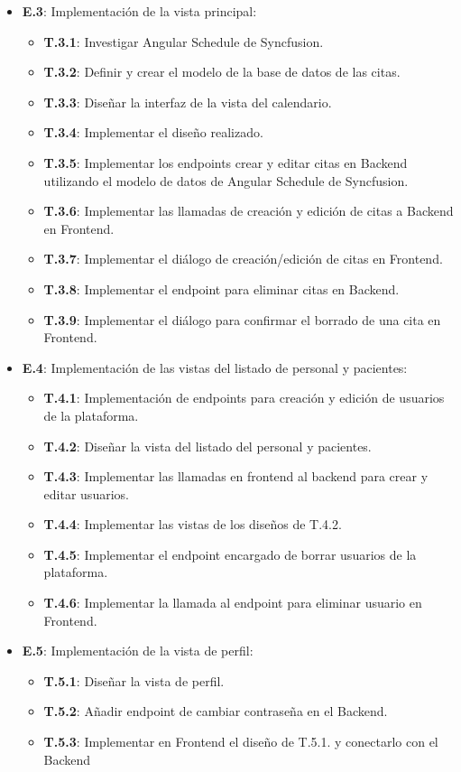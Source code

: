 \begin{itemize}
    \item \textbf{E.3}: Implementación de la vista principal:
    \begin{itemize}
        \item \textbf{T.3.1}: Investigar Angular Schedule de Syncfusion.
        \item \textbf{T.3.2}: Definir y crear el modelo de la base de datos de las citas.
        \item \textbf{T.3.3}: Diseñar la interfaz de la vista del calendario.
        \item \textbf{T.3.4}: Implementar el diseño realizado.
        \item \textbf{T.3.5}:  Implementar los endpoints crear y editar citas en Backend utilizando el modelo de datos de Angular Schedule de Syncfusion.
        \item \textbf{T.3.6}: Implementar las llamadas de creación y edición de citas a Backend en Frontend.
        \item \textbf{T.3.7}:  Implementar el diálogo de creación/edición de citas en Frontend.
        \item \textbf{T.3.8}: Implementar el endpoint para eliminar citas en Backend.
        \item \textbf{T.3.9}: Implementar el diálogo para confirmar el borrado de una cita en Frontend.
    \end{itemize}
    \item \textbf{E.4}: Implementación de las vistas del listado de personal y pacientes:
    \begin{itemize}
        \item \textbf{T.4.1}:  Implementación de endpoints para creación y edición de usuarios de la plataforma.
        \item \textbf{T.4.2}: Diseñar la vista del listado del personal y pacientes.
        \item \textbf{T.4.3}: Implementar las llamadas en frontend al backend para crear y editar usuarios.
        \item \textbf{T.4.4}: Implementar las vistas de los diseños de T.4.2.
        \item \textbf{T.4.5}: Implementar el endpoint encargado de borrar usuarios de la plataforma.
        \item \textbf{T.4.6}: Implementar la llamada al endpoint para eliminar usuario en Frontend.
    \end{itemize}
    \item \textbf{E.5}: Implementación de la vista de perfil:
    \begin{itemize}
        \item \textbf{T.5.1}: Diseñar la vista de perfil.
        \item \textbf{T.5.2}: Añadir endpoint de cambiar contraseña en el Backend.
        \item \textbf{T.5.3}: Implementar en Frontend el diseño de T.5.1. y conectarlo con el Backend
    \end{itemize}


\end{itemize}
